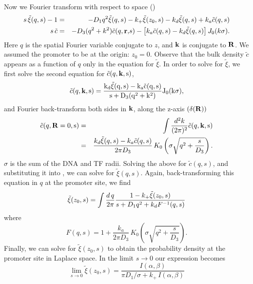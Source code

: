 Now we Fourier transform with respect to space ()
\begin{eqnarray}
 s \, \tilde{\xi}(q, s) - 1 & = & - D_1 q^2 \tilde{\xi}(q,s) - k_+ \tilde{\xi}(z_0,s) - k_d \tilde{\xi}(q,s) + k_a \tilde{c}(q, s) \elabel{FDE_dna} \\
 s \, \tilde{c} & = & - D_3 (q^2 + k^2) \tilde{c}(q, \mathbf r \mathrm, s) - \left[ k_a \tilde{c}(q, s) - k_d \tilde{\xi}(q,s) \right] J_{0}(k \sigma). 
 \elabel{FDE_bulk}
\end{eqnarray}
Here $q$ is the spatial Fourier variable conjugate to $z$, and $\bf k \rm$ is conjugate to $\bf R \bf$. We assumed the promoter to be at the origin: $z_0 = 0$. Observe that the bulk density $\tilde{c}$ appears as a function of $q$ only in the equation for $\tilde{\xi}$. In order to solve for $\tilde{\xi}$, we first solve the second equation for $\tilde{c}(q,\bf k \rm, s)$, 
\begin{equation}
 \tilde{c}(q,\bf k \rm, s) = \frac{k_d \tilde{\xi}(q,s) - k_a\tilde{c}(q,s)}{s + D_3(q^2 + k^2)} J_{0}(k \sigma ),
\end{equation}
and Fourier back-transform both sides in $\bf k \rm$, along the z-axis $(\delta(\bf R \rm))$
\begin{eqnarray}
 \tilde{c}(q,\bf R\rm=0, s) & = & \int \frac{d^2 k}{(2 \pi)^2} \tilde{c}(q,\bf k \rm, s) \\
				 & = & \frac{k_d \tilde{\xi}(q,s) - k_a\tilde{c}(q,s)}{2 \pi D_3} \, K_{0}\left( \sigma \sqrt{q^2 + \frac{s}{D_3}} \right).
\end{eqnarray}
$\sigma$ is the sum of the DNA and TF radii. Solving the above for $\tilde{c}(q,s)$, and substituting it into , we can solve for $\tilde{\xi}(q,s)$. Again, back-transforming this equation in $q$ at the promoter site, we find
\begin{equation}
 \tilde{\xi}(z_0, s) = \int \frac{d\,q}{2 \pi} \frac{1-k_+ \tilde{\xi}(z_0, s)}{s + D_1 q^2+k_d F^{-1}(q,s)}
 \elabel{FDE_dna2}
\end{equation}
where
\begin{equation}
F(q,s) = 1 + \frac{k_a}{2 \pi D_3} \, K_{0}\left( \sigma \sqrt{q^2 + \frac{s}{D_3}} \right).
\end{equation}
Finally, we can solve  for $\tilde{\xi}(z_0, s)$ to obtain the probability density at the promoter site in Laplace space. In the limit $s \rightarrow 0$ our expression becomes
\begin{equation}
 \lim_{s \rightarrow 0} \tilde{\xi}(z_0, s) = \frac{I(\alpha,\beta)}{\pi D_1 / \sigma + k_+ \, I(\alpha,\beta)}
\end{equation}
